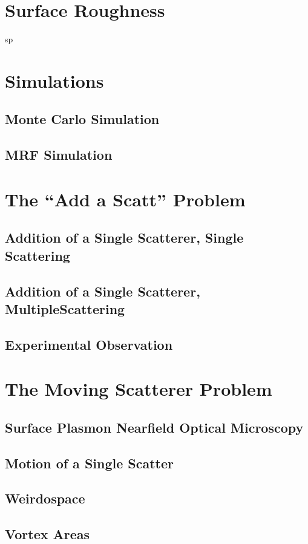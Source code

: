 \documentclass[a4paper,titlepage,onecolumn]{report}
\begin{document}
 \section{Surface Roughness}
 {sp}
 \section{Simulations}
  \subsection{Monte Carlo Simulation}
  \subsection{MRF Simulation}
 \section{The ``Add a Scatt'' Problem}
  \subsection{Addition of a Single Scatterer, Single Scattering}
  \subsection{Addition of a Single Scatterer, MultipleScattering}
  \subsection{Experimental Observation}
 \section{The Moving Scatterer Problem}
  \subsection{Surface Plasmon Nearfield Optical Microscopy}
  \subsection{Motion of a Single Scatter}
  \subsection{Weirdospace}
  \subsection{Vortex Areas}
\end{document}
